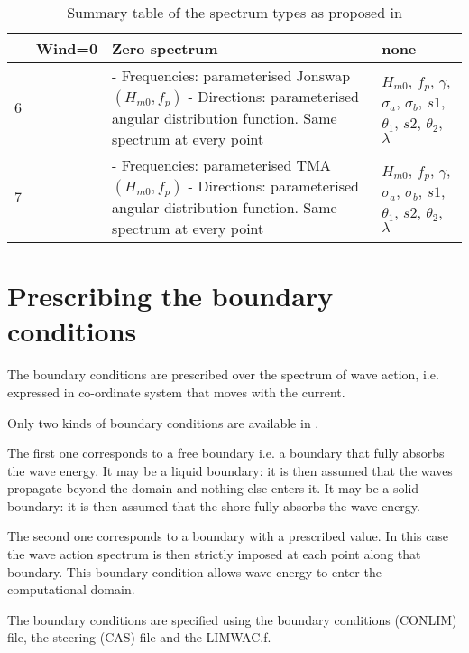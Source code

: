 \begin{table}
\begin{tabular}{|c|c|p{2.2in}|p{1.8in}|}
 & Wind=0 & Zero spectrum & none \\ \hline
6 &  & - Frequencies: parameterised Jonswap  $(H_{m0}, f_p)$  \newline - Directions: parameterised angular distribution function. Same spectrum at every point& $H_{m0}$, $ f_p$, $ \gamma $, $ \sigma_a$, $ \sigma_b$, $s1$, $ \theta_1$, $ s2$, $ \theta_2$, $ \lambda$ \\ \hline
7 &  & - Frequencies: parameterised TMA $(H_{m0}, f_p)$ \newline - Directions: parameterised angular distribution function. Same spectrum at every point & $H_{m0}$, $ f_p$, $ \gamma $, $ \sigma_a$, $ \sigma_b$, $s1$, $ \theta_1$, $ s2$, $ \theta_2$, $ \lambda$ \\ \hline
\end{tabular}
\caption{\label{tab:Jonswap}Summary table of the spectrum types as proposed in \tomawac}
\end{table}



\section{  Prescribing the boundary conditions}

 The boundary conditions are prescribed over the  spectrum of wave action, i.e. expressed in co-ordinate system that moves with the current.

 Only two kinds of boundary conditions are available in \tomawac.

 The first one corresponds to a free boundary i.e. a boundary that fully absorbs the wave energy. It may be a liquid boundary: it is then assumed that the waves propagate beyond the domain and nothing else enters it. It may be a solid boundary: it is then assumed that the shore fully absorbs the wave energy.

 The second one corresponds to a boundary with a prescribed value. In this case the wave action spectrum is then strictly imposed at each point along that boundary. This boundary condition allows wave energy to enter the computational domain.

 The boundary conditions are specified using the boundary conditions (CONLIM) file, the steering (CAS) file and the LIMWAC.f.



